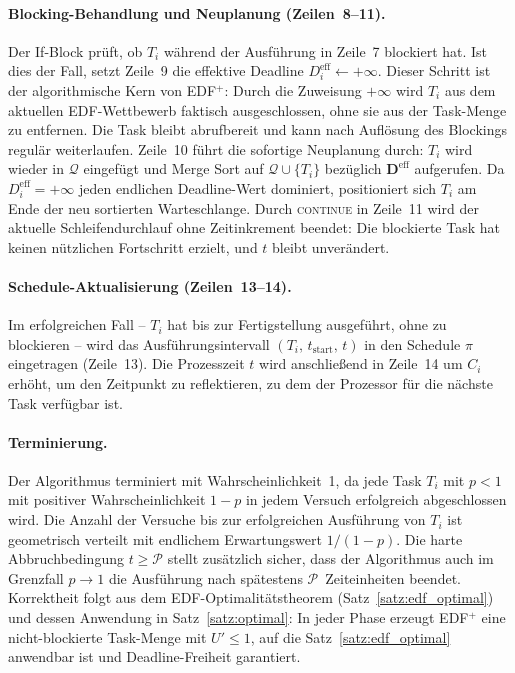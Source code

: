 ﻿\documentclass[a4paper,12pt]{article}
\theoremstyle{definition}
\begin{document}
	\paragraph{Blocking-Behandlung und Neuplanung (Zeilen~8--11).}
	Der If-Block prüft, ob $T_i$ während der Ausführung in Zeile~7 blockiert hat.
	Ist dies der Fall, setzt Zeile~9 die effektive Deadline
	$D_i^{\text{eff}} \leftarrow +\infty$. Dieser Schritt ist der algorithmische Kern von
	EDF$^+$: Durch die Zuweisung $+\infty$ wird $T_i$ aus dem aktuellen EDF-Wettbewerb
	faktisch ausgeschlossen, ohne sie aus der Task-Menge zu entfernen. Die Task bleibt
	abrufbereit und kann nach Auflösung des Blockings regulär weiterlaufen.
	Zeile~10 führt die sofortige Neuplanung durch: $T_i$ wird wieder in $\mathcal{Q}$
	eingefügt und Merge Sort auf $\mathcal{Q} \cup \{T_i\}$ bezüglich
	$\mathbf{D}^{\text{eff}}$ aufgerufen. Da $D_i^{\text{eff}} = +\infty$ jeden
	endlichen Deadline-Wert dominiert, positioniert sich $T_i$ am Ende der neu sortierten
	Warteschlange. Durch \textsc{continue} in Zeile~11 wird der aktuelle Schleifendurchlauf
	ohne Zeitinkrement beendet: Die blockierte Task hat keinen nützlichen Fortschritt
	erzielt, und $t$ bleibt unverändert.
	
	\paragraph{Schedule-Aktualisierung (Zeilen~13--14).}
	Im erfolgreichen Fall -- $T_i$ hat bis zur Fertigstellung ausgeführt, ohne zu blockieren --
	wird das Ausführungsintervall $(T_i,\, t_{\text{start}},\, t)$ in den Schedule $\pi$
	eingetragen (Zeile~13). Die Prozesszeit $t$ wird anschlie\ss{}end in Zeile~14 um $C_i$
	erhöht, um den Zeitpunkt zu reflektieren, zu dem der Prozessor für die nächste
	Task verfügbar ist.
	
	\paragraph{Terminierung.}
	Der Algorithmus terminiert mit Wahrscheinlichkeit~1, da jede Task $T_i$ mit $p < 1$
	mit positiver Wahrscheinlichkeit $1-p$ in jedem Versuch erfolgreich abgeschlossen wird.
	Die Anzahl der Versuche bis zur erfolgreichen Ausführung von $T_i$ ist geometrisch
	verteilt mit endlichem Erwartungswert $1/(1-p)$. Die harte Abbruchbedingung
	$t \ge \mathcal{P}$ stellt zusätzlich sicher, dass der Algorithmus auch im
	Grenzfall $p \to 1$ die Ausführung nach spätestens $\mathcal{P}$~Zeiteinheiten
	beendet. Korrektheit folgt aus dem EDF-Optimalitätstheorem
	(Satz~\ref{satz:edf_optimal}) und dessen Anwendung in
	Satz~\ref{satz:optimal}: In jeder Phase erzeugt EDF$^+$ eine
	nicht-blockierte Task-Menge mit $U' \le 1$, auf die
	Satz~\ref{satz:edf_optimal} anwendbar ist und Deadline-Freiheit garantiert.
	
\end{document}
